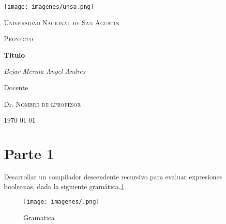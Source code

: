 \documentclass[12pt]{article}
\begin{document}
%

%
\begin{titlepage}

	\centering
	\texttt{[image: imagenes/unsa.png]}\par\vspace{1cm}
	{\scshape\LARGE Universidad Nacional de San Agustin \par}
	\vspace{1cm}
	{\scshape\Large Proyecto \par}
	\vspace{1.5cm}
	{\huge\bfseries Titulo\par}
	\vspace{2cm}
	{\Large\itshape Bejar Merma Angel Andres\par}
	\vfill
	Docente \par
	Dr.  \textsc{Nombre de lprofesor}

	\vfill

	{\large \today\par}
\end{titlepage}












\section{Parte 1}

Desarrollar un compilador descendente recursivo para evaluar expresiones booleanas,
dada la siguiente gramática.\ref{fig:1}




\begin{figure}[H]%
\centering
\texttt{[image: imagenes/.png]}
\caption{Gramatica}
\label{fig:1}
\end{figure}
\end{document}
